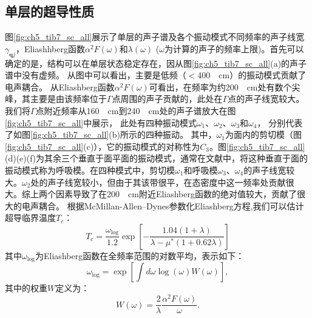 \subsection{单层的超导性质}
图\ref{fig:ch5_tib7_sc_all}展示了单层的声子谱及各个振动模式不同频率的声子线宽$\gamma_{\bm{q}j}$，Eliashhberg函数$\alpha^2 F(\omega)$和$\lambda(\omega)$ ($\omega$为计算的声子的频率上限)。首先可以确定的是，结构可以在单层状态稳定存在，因从图\ref{fig:ch5_tib7_sc_all}(a)的声子谱中没有虚频。
从图中可以看出，主要是低频（$<$\SI{400}{\per\cm}）的振动模式贡献了电声耦合。
从Eliashberg函数$\alpha^2 F(\omega)$可看出，在频率为约\SI{200}{\per\cm}处有数个尖峰，其主要是由该频率位于$\Gamma$点周围的声子贡献的，此处在$\Gamma$点的声子线宽较大。我们将$\Gamma$点附近频率从\SI{160}{\per\cm}到\SI{240}{\per\cm}处的声子谱放大在图\ref{fig:ch5_tib7_sc_all}中展示，
此处有四种振动模式$\omega_1$、$\omega_2$、$\omega_3$和$\omega_4$，
分别代表了如图\ref{fig:ch5_tib7_sc_all}(b)所示的四种振动。
其中，$\omega_1$为面内的剪切模（图\ref{fig:ch5_tib7_sc_all}(c)），它的振动模式的对称性为$C_3$。图\ref{fig:ch5_tib7_sc_all}(d)(e)(f)为其余三个垂直于面平面的振动模式，通常在文献中，将这种垂直于面的振动模式称为呼吸模。在四种模式中，剪切模$\omega_1$和呼吸模$\omega_3$、$\omega_4$的声子线宽较大。$\omega_2$处的声子线宽较小，但由于其该带很平，在态密度中这一频率处贡献很大。综上两个因素导致了在\SI{200}{\per\cm}附近Eliashberg函数的绝对值较大，贡献了很大的电声耦合。
根据McMillan-Allen–Dynes参数化Eliashberg方程,我们可以估计超导临界温度$T_c$：
\begin{equation}
  T_c = \frac{\omega_{\mathrm{log}}}{1.2}
  \exp{\left[ {-\frac{1.04(1+\lambda)}{\lambda-\mu^*(1+0.62\lambda)}} \right]}
\end{equation}
其中$\omega_{\mathrm{log}}$为Eliashberg函数在全频率范围的对数平均，表示如下：
\begin{equation}
  \omega_\mathrm{log} = \exp \left[ {\int d\omega \log(\omega)W(\omega)} \right],
\end{equation}
其中的权重$W$定义为：
\begin{equation}
  W(\omega) = \frac{2}{\lambda} \frac{\alpha^2 F(\omega)}{\omega}.
\end{equation}

